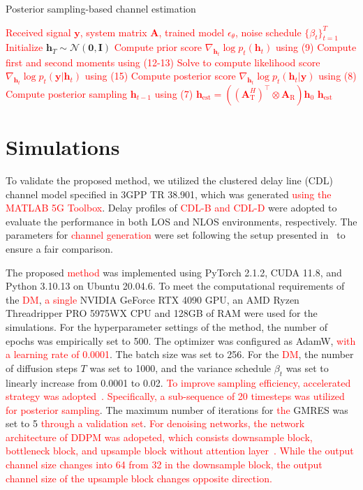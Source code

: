 \documentclass[lettersize,journal]{IEEEtran}
\newcommand{\tred}{\textcolor{red}}
\begin{document}
\begin{algorithm}[!t]
\caption{Posterior sampling-based channel estimation}
\label{alg:algorithm1}
\begin{algorithmic}[1]
\REQUIRE \tred{Received signal $\mathbf{y}$, system matrix $\mathbf{A}$, trained model $\epsilon_{\theta}$, noise schedule $\{\beta_{t}\}_{t=1}^{T}$}
\STATE \tred{Initialize} $\mathbf{h}_T \sim \mathcal{N}(\mathbf{0}, \mathbf{I})$
	\STATE \tred{Compute prior score $\nabla_{\mathbf{h}_{t}}\log p_{t}(\mathbf{h}_{t})$ using (9)}
	\STATE \tred{Compute first and second moments using (12-13)}
	\STATE \tred{Solve to compute likelihood score $\nabla_{\mathbf{h}_{t}}\log p_{t}(\mathbf{y}|\mathbf{h}_{t})$ using (15)}
	\STATE \tred{Compute posterior score $\nabla_{\mathbf{h}_{t}}\log p_{t}(\mathbf{h}_{t}|\mathbf{y})$ using (8)}
	\STATE \tred{Compute posterior sampling $\mathbf{h}_{t-1}$ using (7)}
\ENDFOR
\STATE \tred{$\mathbf{h}_{\text{est}} = ((\mathbf{A}_{\text{T}}^{H})^{\top}\otimes \mathbf{A}_{\text{R}})\mathbf{h}_{0}$}
\RETURN \tred{$\mathbf{h}_{\text{est}}$}
\end{algorithmic}
\end{algorithm}

\section{Simulations}

To validate the proposed method, we utilized the clustered delay line (CDL)
channel model specified in 3GPP TR 38.901, which was generated \tred{using the MATLAB 5G Toolbox}. Delay profiles of \tred{CDL-B and CDL-D} were adopted to evaluate the performance in both LOS and NLOS environments, respectively. The parameters for \tred{channel generation} were set following the setup presented in~\cite{arvinteMIMOChannelEstimation2023} to ensure a fair comparison.

The proposed \tred{method} was implemented using PyTorch 2.1.2, CUDA 11.8, and Python 3.10.13 on Ubuntu 20.04.6. To meet the computational requirements of the \tred{DM}, \tred{a single} NVIDIA GeForce RTX 4090 GPU, an AMD Ryzen Threadripper PRO 5975WX CPU and 128GB of RAM were used for the simulations. For the hyperparameter settings of the method, the number of epochs was empirically set to 500. The optimizer was configured as AdamW, \tred{with a learning rate of 0.0001}. The batch size was set to 256. %
For the \tred{DM}, the number of diffusion steps $T$ was set to 1000, and the variance schedule $\beta_{t}$ was set to linearly increase from 0.0001 to 0.02. \tred{To improve sampling efficiency, accelerated strategy was adopted~\cite{songDenoisingDiffusionImplicit2020}. Specifically, a sub-sequence of 20 timesteps was utilized for posterior sampling}. The maximum number of iterations for \tred{the} GMRES was set to 5 \tred{through a validation set}. \tred{For denoising networks, the network architecture of DDPM was adopeted, which consists downsample block, bottleneck block, and upsample block without attention layer~\cite{hoDenoisingDiffusionProbabilistic2020}. While the output channel size changes into 64 from 32 in the downsample block, the output channel size of the upsample block changes opposite direction.}
\end{document}
